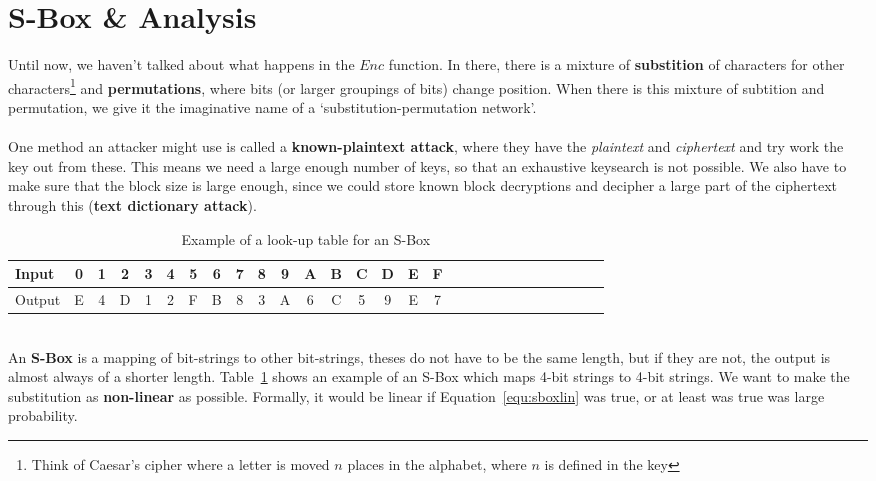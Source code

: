 \section{S-Box \& Analysis}\label{sec:sbox}
    Until now, we haven't talked about what happens in the $Enc$ function. In there, there is a mixture of \textbf{substition} of characters for other characters\footnote{Think of Caesar's cipher where a letter is moved $n$ places in the alphabet, where $n$ is defined in the key} and \textbf{permutations}, where bits (or larger groupings of bits) change position. When there is this mixture of subtition and permutation, we give it the imaginative name of a `substitution-permutation network'.\\
    \\
    One method an attacker might use is called a \textbf{known-plaintext attack}, where they have the \textit{plaintext} and \textit{ciphertext} and try work the key out from these. This means we need a large enough number of keys, so that an exhaustive keysearch is not possible. We also have to make sure that the block size is large enough, since we could store known block decryptions and decipher a large part of the ciphertext through this (\textbf{text dictionary attack}).\\
    \begin{table}[htp!]
        \centering
        \begin{tabular}{lccccccccccccccccccccccccccc}
            \toprule
            Input & 0 & 1 & 2 & 3 & 4 & 5 & 6 & 7 & 8 & 9 & A & B & C & D  & E & F\\
            \midrule
            Output & E & 4 & D & 1 & 2 & F & B & 8 & 3 & A & 6 & C & 5 & 9 & E & 7\\
            \bottomrule
        \end{tabular}
        \caption{Example of a look-up table for an S-Box}
        \label{fig:lookupsbox}
    \end{table}
    \\
    An \textbf{S-Box} is a mapping of bit-strings to other bit-strings, theses do not have to be the same length, but if they are not, the output is almost always of a shorter length. Table~\ref{fig:lookupsbox} shows an example of an S-Box which maps 4-bit strings to 4-bit strings. We want to make the substitution as \textbf{non-linear} as possible. Formally, it would be linear if Equation~\ref{equ:sboxlin} was true, or at least was true was large probability.
    
